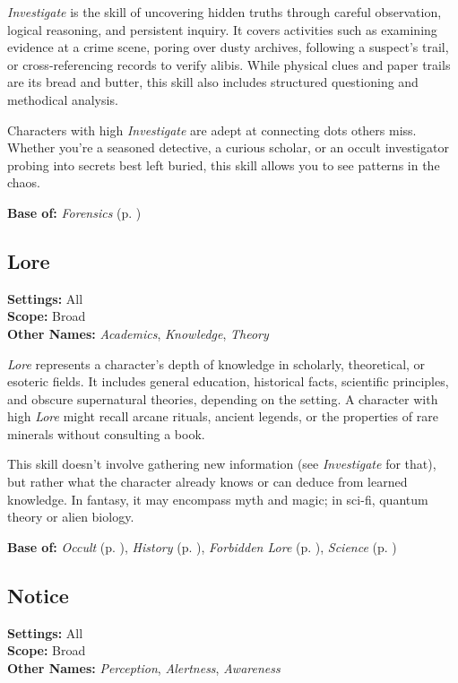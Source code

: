 \emph{Investigate} is the skill of uncovering hidden truths through careful observation, logical reasoning, and persistent inquiry. It covers activities such as examining evidence at a crime scene, poring over dusty archives, following a suspect’s trail, or cross-referencing records to verify alibis. While physical clues and paper trails are its bread and butter, this skill also includes structured questioning and methodical analysis.

Characters with high \emph{Investigate} are adept at connecting dots others miss. Whether you're a seasoned detective, a curious scholar, or an occult investigator probing into secrets best left buried, this skill allows you to see patterns in the chaos.

\vspace{0.5\baselineskip}
\noindent\textbf{Base of:} \emph{Forensics} (p. \pageref{skill:forensics})

\subsection{Lore}\label{skill:lore}
\textbf{Settings:} All\\
\textbf{Scope:} Broad\\
\textbf{Other Names:} \emph{Academics}, \emph{Knowledge}, \emph{Theory}\\
\vspace{\baselineskip}

\emph{Lore} represents a character’s depth of knowledge in scholarly, theoretical, or esoteric fields. It includes general education, historical facts, scientific principles, and obscure supernatural theories, depending on the setting. A character with high \emph{Lore} might recall arcane rituals, ancient legends, or the properties of rare minerals without consulting a book.

This skill doesn’t involve gathering new information (see \emph{Investigate} for that), but rather what the character already knows or can deduce from learned knowledge. In fantasy, it may encompass myth and magic; in sci-fi, quantum theory or alien biology.

\vspace{0.5\baselineskip}
\noindent\textbf{Base of:} \emph{Occult} (p. \pageref{skill:occult}), \emph{History} (p. \pageref{skill:history}), \emph{Forbidden Lore} (p. \pageref{skill:forbidden-lore}), \emph{Science} (p. \pageref{skill:science})

\subsection{Notice}\label{skill:notice}
\textbf{Settings:} All\\
\textbf{Scope:} Broad\\
\textbf{Other Names:} \emph{Perception}, \emph{Alertness}, \emph{Awareness}\\
\vspace{\baselineskip}

